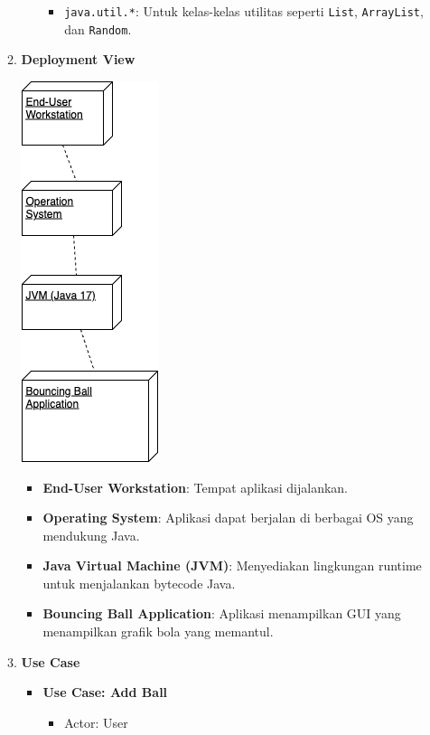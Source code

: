 \documentclass[a4paper]{article}
\begin{document}
\begin{enumerate}[itemsep=1em]
\begin{enumerate}[itemsep=1em]
\begin{itemize}[itemsep=1em]
\begin{itemize}
        \item \texttt{java.util.*}: Untuk kelas-kelas utilitas seperti \texttt{List}, \texttt{ArrayList}, dan \texttt{Random}.
      \end{itemize}
    \end{itemize}
    \item \textbf{Deployment View}
    \begin{center}
      \includegraphics[height=0.4\textheight,keepaspectratio]{bouncing-ball-deployment-view.png}
    \end{center}
    \begin{itemize}[itemsep=1em]
      \item \textbf{End-User Workstation}: Tempat aplikasi dijalankan.
      \item \textbf{Operating System}: Aplikasi dapat berjalan di berbagai OS yang mendukung Java.
      \item \textbf{Java Virtual Machine (JVM)}: Menyediakan lingkungan runtime untuk menjalankan bytecode Java.
      \item \textbf{Bouncing Ball Application}: Aplikasi menampilkan GUI yang menampilkan grafik bola yang memantul.
    \end{itemize}
    \item \textbf{Use Case}
    \begin{itemize}
      \item \textbf{Use Case: Add Ball}
      \begin{itemize}
        \item Actor: User

\end{itemize}
\end{itemize}
\end{enumerate}
\end{enumerate}
\end{document}
